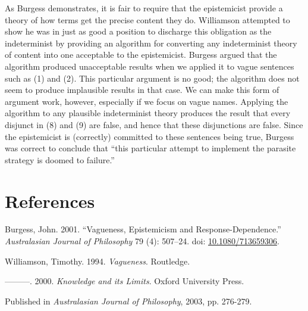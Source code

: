 \documentclass[
  11pt,
  letterpaper,
  DIV=11,
  numbers=noendperiod,
  twoside]{scrartcl}
\newlength{\cslhangindent}
\newenvironment{CSLReferences}[2] %
 {\begin{list}{}{%
  \setlength{\itemindent}{0pt}
  \setlength{\leftmargin}{0pt}
  \setlength{\parsep}{0pt}
  \ifodd #1
   \setlength{\leftmargin}{\cslhangindent}
   \setlength{\itemindent}{-1\cslhangindent}
  \fi
  \setlength{\itemsep}{#2\baselineskip}}}
 {\end{list}}
\begin{document}
As Burgess demonstrates, it is fair to require that the epistemicist
provide a theory of how terms get the precise content they do.
Williamson attempted to show he was in just as good a position to
discharge this obligation as the indeterminist by providing an algorithm
for converting any indeterminist theory of content into one acceptable
to the epistemicist. Burgess argued that the algorithm produced
unacceptable results when we applied it to vague sentences such as (1)
and (2). This particular argument is no good; the algorithm does not
seem to produce implausible results in that case. We can make this form
of argument work, however, especially if we focus on vague names.
Applying the algorithm to any plausible indeterminist theory produces
the result that every disjunct in (8) and (9) are false, and hence that
these disjunctions are false. Since the epistemicist is (correctly)
committed to these sentences being true, Burgess was correct to conclude
that ``this particular attempt to implement the parasite strategy is
doomed to failure.''

\section*{References}\label{references}

\label{refs}
\begin{CSLReferences}{1}{0}
Burgess, John. 2001. {``Vagueness, Epistemicism and
Response-Dependence.''} \emph{Australasian Journal of Philosophy} 79
(4): 507--24. doi:
\href{https://doi.org/10.1080/713659306}{10.1080/713659306}.

Williamson, Timothy. 1994. \emph{{Vagueness}}. Routledge.

---------. 2000. \emph{{Knowledge and its Limits}}. Oxford University
Press.

\end{CSLReferences}



\noindent Published in\emph{
Australasian Journal of Philosophy}, 2003, pp. 276-279.
\end{document}
